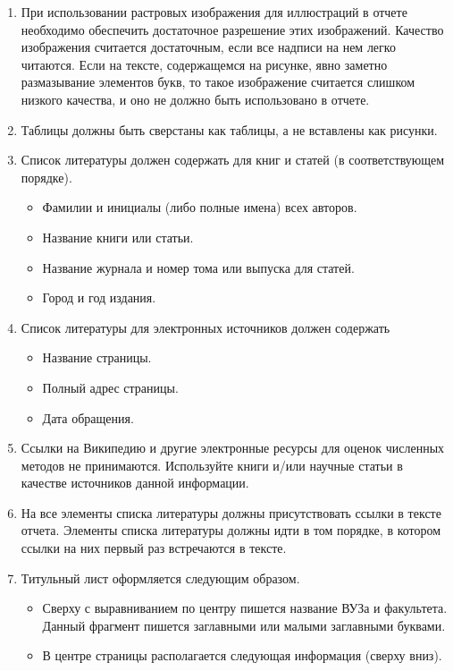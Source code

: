 \documentclass[a4paper,12pt,titlepage,finall]{article}
\begin{document}
\begin{enumerate}
    и подписаны. Нумерация сквозная, отдельная для рисунков и таблиц, арабскими цифрами.
\item При использовании растровых изображения для иллюстраций в отчете
    необходимо обеспечить достаточное разрешение этих изображений. Качество изображения
    считается достаточным, если все надписи на нем легко читаются. Если на тексте, содержащемся
    на рисунке, явно заметно размазывание элементов букв, то такое изображение считается
    слишком низкого качества, и оно не должно быть использовано в отчете.
\item Таблицы должны быть сверстаны как таблицы, а не вставлены как рисунки.
\item Список литературы должен содержать для книг и статей (в соответствующем порядке).
    \begin{itemize}
    \item Фамилии и инициалы (либо полные имена) всех авторов.
    \item Название книги или статьи.
    \item Название журнала и номер тома или выпуска для статей.
    \item Город и год издания.
    \end{itemize}
\item Список литературы для электронных источников должен содержать
    \begin{itemize}
    \item Название страницы.
    \item Полный адрес страницы.
    \item Дата обращения.
    \end{itemize}
\item Ссылки на Википедию и другие электронные ресурсы для оценок численных 
    методов не принимаются. Используйте книги и/или научные статьи в качестве 
    источников данной информации.
\item На все элементы списка литературы должны присутствовать ссылки в тексте отчета. Элементы
    списка литературы должны идти в том порядке, в котором ссылки на них первый
    раз встречаются в тексте.
\item Титульный лист оформляется следующим образом.
    \begin{itemize}
    \item Сверху с выравниванием по центру пишется название ВУЗа и факультета. Данный
        фрагмент пишется заглавными или малыми заглавными буквами.
    \item В центре страницы располагается следующая информация (сверху вниз).

\end{itemize}
\end{enumerate}
\end{document}
